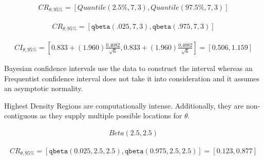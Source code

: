 \documentclass[12pt]{article}
\begin{document}
\begin{enumerate}
\begin{align*}
    CR_{\theta, 95\%} = [Quantile(2.5\%, 7, 3), Quantile(97.5\%, 7, 3)]
\end{align*}
    
\begin{align*}
    CR_{\theta, 95\%}  = [\texttt{qbeta}(.025, 7 , 3), \texttt{qbeta}(.975, 7 , 3)]
\end{align*}


\begin{align*}
    CI_{\theta, 95\%} = [0.833 + (1.960)\frac{0.4082}{\sqrt{6}}, 0.833 + (1.960)\frac{0.4082}{\sqrt{6}}] = [0.506, 1.159]
\end{align*}


Bayesian confidence intervals use the data to construct the interval whereas an Frequentist confidence interval does not take it into consideration and it assumes an asymptotic normality. 


Highest Density Regions are computationally intense. Additionally, they are non-contiguous as they supply multiple possible locations for $\theta$. 


\begin{align*}
    Beta(2.5, 2.5)
\end{align*}

\begin{align*}
    CR_{\theta, 95\%} = [\texttt{qbeta}(0.025, 2.5, 2.5), \texttt{qbeta}(0.975, 2.5, 2.5)] = [0.123, 0.877]
\end{align*}


\end{enumerate}
\end{document}
